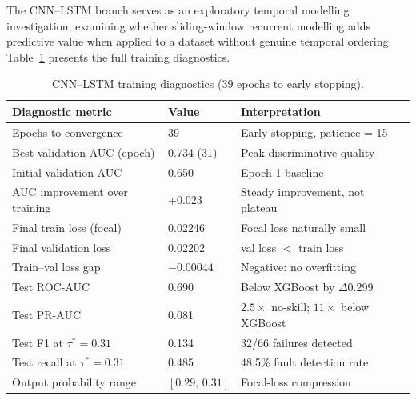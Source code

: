 \documentclass[sensors,article,submit,pdftex,moreauthors]{Definitions/mdpi}
\newcommand{\mdpitablefont}{\footnotesize}
\begin{document}
The CNN--LSTM branch serves as an exploratory temporal modelling
investigation, examining whether sliding-window recurrent modelling adds
predictive value when applied to a dataset without genuine temporal
ordering.
Table~\ref{tab:fitdiag} presents the full training diagnostics.

\begin{table}[H]
\caption{CNN--LSTM training diagnostics (39 epochs to early stopping).\label{tab:fitdiag}}
\centering
\mdpitablefont
\begin{tabularx}{\textwidth}{lXX}
\toprule
\textbf{Diagnostic metric} & \textbf{Value} & \textbf{Interpretation} \\
\midrule
Epochs to convergence         & 39             & Early stopping, patience = 15 \\
Best validation AUC (epoch)   & 0.734 (31)     & Peak discriminative quality \\
Initial validation AUC        & 0.650          & Epoch 1 baseline \\
AUC improvement over training & $+0.023$       & Steady improvement, not plateau \\
Final train loss (focal)      & 0.02246        & Focal loss naturally small \\
Final validation loss         & 0.02202        & val loss $<$ train loss \\
Train--val loss gap           & $-0.00044$     & Negative: no overfitting \\
Test ROC-AUC                  & 0.690          & Below XGBoost by $\Delta$0.299 \\
Test PR-AUC                   & 0.081          & $2.5\times$ no-skill; $11\times$ below XGBoost \\
Test F1 at $\tau^* = 0.31$   & 0.134          & 32/66 failures detected \\
Test recall at $\tau^* = 0.31$ & 0.485         & 48.5\% fault detection rate \\
Output probability range      & $[0.29,\,0.31]$ & Focal-loss compression \\
\bottomrule
\end{tabularx}
\end{table}
\end{document}
